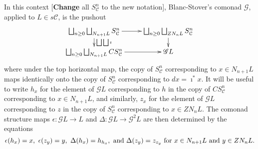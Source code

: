 \documentclass[11pt]{amsart}
\theoremstyle{plain}
\theoremstyle{definition}
\renewcommand{\to}{\longrightarrow}
\newcommand{\scrG}{\mathscr{G}}
\newcommand{\calV}{\mathcal{V}}
\newcommand{\calc}{\mathcal{C}}
\theoremstyle{plain}
\newcommand{\vect}[2]{\calV^{#1}_{#2}}
\newcommand{\BSW}{{\scrG}}
\newcommand{\F}{\mathbb{F}}
\newcommand{\complexes}{\textup{ch}_+}
\newcommand{\Ftwo}{\F_2}
\begin{document}
\begin{Composite functor spectral sequences}

In this context [\textbf{Change} all $S_\calc^n$ to the new notation], Blanc-Stover's comonad $\BSW$, applied to $L\in s\calc$, is the pushout
\[\xymatrix@R=4mm{
\bigsqcup_{n\geq0}\bigsqcup_{N_{n+1}L}S_\calc^n
\ar[r]\ar[d]^-{\bigsqcup\bigsqcup\imath}
&%
\bigsqcup_{n\geq0}\bigsqcup_{ZN_{n}L}S_\calc^n\ar[d]\\%
\bigsqcup_{n\geq0}\bigsqcup_{N_{n+1}L}CS_\calc^n
\ar[r]&%
\BSW L%
}\]
where under the top horizontal map, the copy of $S^n_\calc$ corresponding to $x\in N_{n+1}L$ maps identically onto the copy of $S^n_\calc$ corresponding to $dx=\imath^*x$. It will be useful to write $h_x$ for the element of $\BSW L$ corresponding to $h$ in the copy of $CS^n_\calc$ corresponding to $x\in N_{n+1}L$, and similarly, $z_x$ for the element of $\BSW L$ corresponding to $z$ in the copy of $S^n_\calc$ corresponding to $x\in ZN_{n}L$. The comonad structure maps $\epsilon:\BSW L\to L$ and $\Delta:\BSW L\to \BSW^2L$ are then determined by the equations
\[\epsilon(h_x)=x,\ \epsilon(z_y)=y,\ \Delta(h_x)=h_{h_x},\textup{ and }\Delta(z_y)=z_{z_y}\textup{ for $x\in N_{n+1}L$ and $y\in ZN_nL$.}\]


\end{Composite functor spectral sequences}
\end{document}
